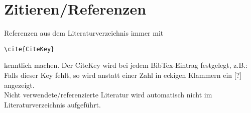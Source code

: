 \chapter{Zitieren/Referenzen}

Referenzen aus dem Literaturverzeichnis immer mit \begin{verbatim}\cite{CiteKey}\end{verbatim} kenntlich machen.
Der CiteKey wird bei jedem BibTex-Eintrag festgelegt, z.B.: \cite{Roughan.10.03.2015}\\
Falls dieser Key fehlt, so wird anstatt einer Zahl in eckigen Klammern ein [?] angezeigt.\\
Nicht verwendete/referenzierte Literatur wird automatisch nicht im Literaturverzeichnis aufgeführt.